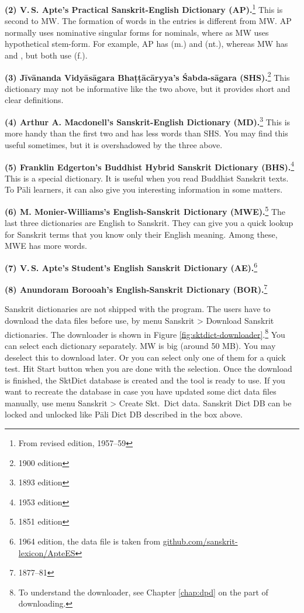 \textbf{(2) V.\,S. Apte's Practical Sanskrit-English Dictionary (AP).}\footnote{From revised edition, 1957--59} This is second to MW. The formation of words in the entries is different from MW. AP normally uses nominative singular forms for nominals, where as MW uses hypothetical stem-form. For example, AP has  (m.) and  (nt.), whereas MW has  and , but both use  (f.).

\textbf{(3) Jīvānanda Vidyāsāgara Bhaṭṭācāryya's Śabda-sā\-gara (SHS).}\footnote{1900 edition} This dictionary may not be informative like the two above, but it provides short and clear definitions.

\textbf{(4) Arthur A. Macdonell's Sanskrit-English Dictionary (MD).}\footnote{1893 edition} This is more handy than the first two and has less words than SHS. You may find this useful sometimes, but it is overshadowed by the three above.

\textbf{(5) Franklin Edgerton's Buddhist Hybrid Sanskrit Dictionary (BHS).}\footnote{1953 edition} This is a special dictionary. It is useful when you read Buddhist Sanskrit texts. To Pāli learners, it can also give you interesting information in some matters.

\textbf{(6) M. Monier-Williams's English-Sanskrit Dictionary (MWE).}\footnote{1851 edition} The last three dictionaries are English to Sanskrit. They can give you a quick lookup for Sanskrit terms that you know only their English meaning. Among these, MWE has more words.

\textbf{(7) V.\,S. Apte's Student's English Sanskrit Dictionary (AE).}\footnote{1964 edition, the data file is taken from \url{github.com/sanskrit-lexicon/ApteES}}

\textbf{(8) Anundoram Borooah's English-Sanskrit Dictionary (BOR).}\footnote{1877--81}

Sanskrit dictionaries are not shipped with the program. The users have to download the data files before use, by menu Sanskrit > {\faSix {}} Download Sanskrit dictionaries. The downloader is shown in Figure \ref{fig:sktdict-downloader}.\footnote{To understand the downloader, see Chapter \ref{chap:dpd} on the part of downloading.} You can select each dictionary separately. MW is big (around 50 MB). You may deselect this to download later. Or you can select only one of them for a quick test. Hit Start button when you are done with the selection. Once the download is finished, the SktDict database is created and the tool is ready to use. If you want to recreate the database in case you have updated some dict data files manually, use menu Sanskrit > {\faSix {}} Create Skt.\ Dict data. Sanskrit Dict DB can be locked and unlocked like Pāli Dict DB described in the box above.

